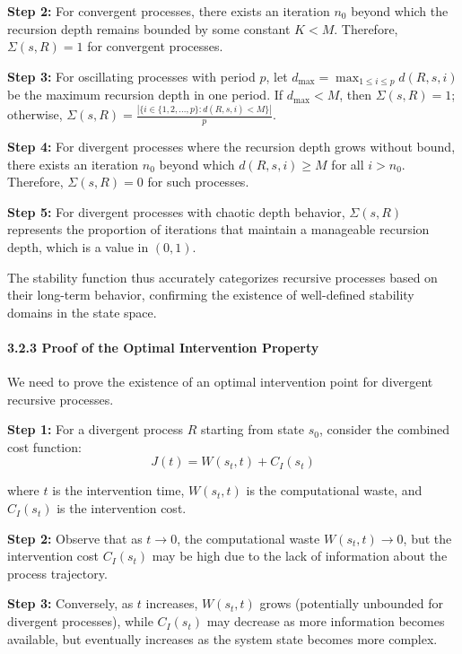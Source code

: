\documentclass[
]{article}
\begin{document}
\textbf{Step 2:} For convergent processes, there exists an iteration
\(n_0\) beyond which the recursion depth remains bounded by some
constant \(K < M\). Therefore, \(\Sigma(s, R) = 1\) for convergent
processes.

\textbf{Step 3:} For oscillating processes with period \(p\), let
\(d_{\max} = \max_{1 \leq i \leq p} d(R, s, i)\) be the maximum
recursion depth in one period. If \(d_{\max} < M\), then
\(\Sigma(s, R) = 1\); otherwise,
\(\Sigma(s, R) = \frac{|\{i \in \{1,2,...,p\} : d(R, s, i) < M\}|}{p}\).

\textbf{Step 4:} For divergent processes where the recursion depth grows
without bound, there exists an iteration \(n_0\) beyond which
\(d(R, s, i) \geq M\) for all \(i > n_0\). Therefore,
\(\Sigma(s, R) = 0\) for such processes.

\textbf{Step 5:} For divergent processes with chaotic depth behavior,
\(\Sigma(s, R)\) represents the proportion of iterations that maintain a
manageable recursion depth, which is a value in \((0,1)\).

The stability function thus accurately categorizes recursive processes
based on their long-term behavior, confirming the existence of
well-defined stability domains in the state space.

\paragraph{3.2.3 Proof of the Optimal Intervention
Property}\label{proof-of-the-optimal-intervention-property}

We need to prove the existence of an optimal intervention point for
divergent recursive processes.

\textbf{Step 1:} For a divergent process \(R\) starting from state
\(s_0\), consider the combined cost function:
\[J(t) = W(s_t, t) + C_I(s_t)\]

where \(t\) is the intervention time, \(W(s_t, t)\) is the computational
waste, and \(C_I(s_t)\) is the intervention cost.

\textbf{Step 2:} Observe that as \(t \to 0\), the computational waste
\(W(s_t, t) \to 0\), but the intervention cost \(C_I(s_t)\) may be high
due to the lack of information about the process trajectory.

\textbf{Step 3:} Conversely, as \(t\) increases, \(W(s_t, t)\) grows
(potentially unbounded for divergent processes), while \(C_I(s_t)\) may
decrease as more information becomes available, but eventually increases
as the system state becomes more complex.
\end{document}
